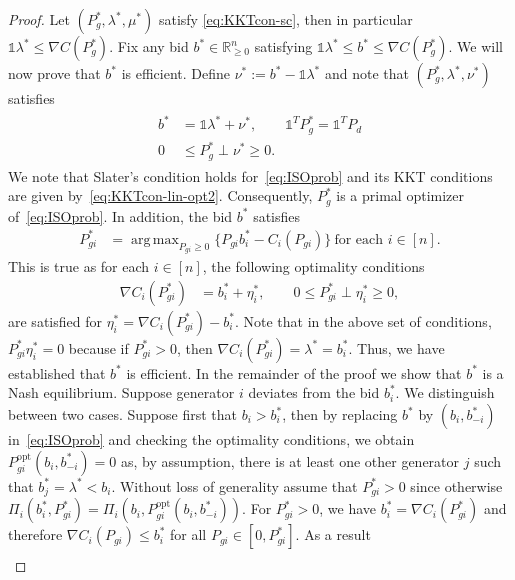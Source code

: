 \documentclass[journal]{IEEEtran}
\newcommand{\1}{\mathds 1}
\newcommand{\n}{\nabla}
\newcommand{\realnonnegative}{{\mathbb{R}}_{\ge 0}}
\newcommand{\until}[1]{[#1]}
\renewcommand{\l}{\lambda}
\DeclareMathOperator*{\argmax}{arg\,max}
\theoremstyle{remark}
\theoremstyle{definition}
\begin{document}
\begin{proof}
  Let $( P_{g}^*,\l^*,\mu^*)$ satisfy \eqref{eq:KKTcon-sc}, then in
  particular $\1\l^*\leq \nabla C(P_g^*)$.  Fix any bid $b^* \in
  \realnonnegative^n$ satisfying $\1\l^*\leq b^*\leq \nabla C(P_g^*)$. 
  We will now prove that $b^*$ is efficient. Define $\nu^*:=b^*-\1\l^*$
  and note that $(P_g^*,\l^*,\nu^*)$ satisfies
  \begin{align}\label{eq:KKTcon-lin-opt2}
    \begin{aligned}
      b^*&=\1\l^*+\nu^*, \qquad \1^T P_g^*=\1^TP_d
      \\
      0&\leq P_g^* \perp \nu^*\geq 0.
    \end{aligned}
  \end{align}
  We note that Slater's condition holds for~\eqref{eq:ISOprob} and its
  KKT conditions are given by~\eqref{eq:KKTcon-lin-opt2}. Consequently,
  $P_g^*$ is a primal optimizer of~\eqref{eq:ISOprob}. In addition,
  the bid $b^*$ satisfies
  \begin{align}\label{eq:eff-bid2}
    P_{gi}^*&=\argmax_{P_{gi}\geq0}\{P_{gi}b_i^*-C_i(P_{gi})\}\ \text{
      for each } i\in\until{n}.
  \end{align}
  This is true as for each $i \in \until{n}$, the following optimality
  conditions
  \begin{align*}
    \nabla C_i(P_{gi}^*)&=b_i^*+\eta^*_i, \qquad 
    0\leq P_{gi}^*\perp  \eta^*_i \geq 0,
  \end{align*}
  are satisfied for $\eta^*_i=\nabla C_i(P_{gi}^*)-b^*_i$. Note that
  in the above set of conditions, $P_{gi}^* \eta^*_i = 0$ because if
  $P_{gi}^* >0$, then $\nabla C_i(P^*_{gi}) = \l^* = b^*_i$.  Thus, we
  have established that $b^*$ is efficient.  In the remainder of the
  proof we show that $b^*$ is a Nash equilibrium.  Suppose generator
  $i$ deviates from the bid $b_i^*$. We distinguish between two cases.
  Suppose first that $b_i>b_i^*$, then by replacing $b^*$ by
  $(b_i,b_{-i}^*)$ in~\eqref{eq:ISOprob} and checking the optimality
  conditions, we obtain $P_{gi}^{\text{opt}}(b_i,b_{-i}^*)=0$ as, by
  assumption, there is at least one other generator $j$ such that
  $b_j^*=\l^*<b_i$. Without loss of generality assume that $P^*_{gi} >
  0$ since otherwise $\Pi_i(b_i^*,P_{gi}^*) =
  \Pi_i(b_i,P_{gi}^{\text{opt}}(b_i,b_{-i}^*))$. For $P^*_{gi} > 0$,
  we have $b^*_i = \nabla C_i(P^*_{gi})$ and therefore $\n
  C_i(P_{gi})\leq b^*_i$ for all $P_{gi} \in [0,P^*_{gi}]$. As a
  result
  \begin{align*}

\end{align*}
\end{proof}
\end{document}
